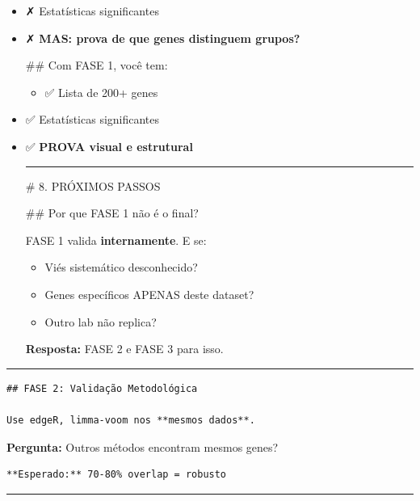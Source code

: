\documentclass[
]{article}
\providecommand{\tightlist}{%
  \setlength{\itemsep}{0pt}\setlength{\parskip}{0pt}}
\begin{document}
\begin{itemize}
\item
  ✗ Estatísticas significantes
\item
  ✗ \textbf{MAS: prova de que genes distinguem grupos?}

  \#\# Com FASE 1, você tem:

  \begin{itemize}
  \tightlist
  \item
    ✅ Lista de 200+ genes
  \end{itemize}
\item
  ✅ Estatísticas significantes
\item
  ✅ \textbf{PROVA visual e estrutural}

  \begin{center}\rule{0.5\linewidth}{0.5pt}\end{center}

  \# 8. PRÓXIMOS PASSOS

  \#\# Por que FASE 1 não é o final?

  FASE 1 valida \textbf{internamente}. E se:

  \begin{itemize}
  \tightlist
  \item
    Viés sistemático desconhecido?
  \item
    Genes específicos APENAS deste dataset?
  \item
    Outro lab não replica?
  \end{itemize}

  \textbf{Resposta:} FASE 2 e FASE 3 para isso.
\end{itemize}

\begin{center}\rule{0.5\linewidth}{0.5pt}\end{center}

\begin{verbatim}
## FASE 2: Validação Metodológica

Use edgeR, limma-voom nos **mesmos dados**.
\end{verbatim}

\textbf{Pergunta:} Outros métodos encontram mesmos genes?

\begin{verbatim}
**Esperado:** 70-80% overlap = robusto
\end{verbatim}

\begin{center}\rule{0.5\linewidth}{0.5pt}\end{center}
\end{document}
